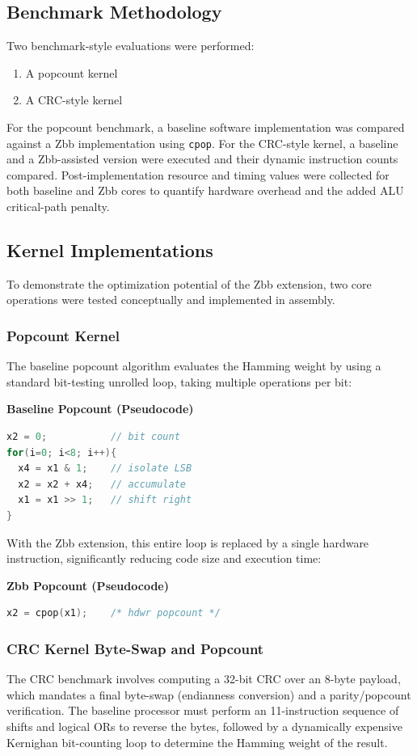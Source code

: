 \documentclass[conference]{IEEEtran}
\begin{document}
	\subsection{Benchmark Methodology}
	Two benchmark-style evaluations were performed:
	\begin{enumerate}
		\item A popcount kernel
		\item A CRC-style kernel
	\end{enumerate}
	
	For the popcount benchmark, a baseline software implementation was compared against a Zbb implementation using \texttt{cpop}. For the CRC-style kernel, a baseline and a Zbb-assisted version were executed and their dynamic instruction counts compared. Post-implementation resource and timing values were collected for both baseline and Zbb cores to quantify hardware overhead and the added ALU critical-path penalty.
	
	\subsection{Kernel Implementations}
	To demonstrate the optimization potential of the Zbb extension, two core operations were tested conceptually and implemented in assembly.
	
	\subsubsection{Popcount Kernel}
	The baseline popcount algorithm evaluates the Hamming weight by using a standard bit-testing unrolled loop, taking multiple operations per bit:

\noindent\textbf{Baseline Popcount (Pseudocode)}
\begin{lstlisting}[language=C]
x2 = 0;           // bit count
for(i=0; i<8; i++){
  x4 = x1 & 1;    // isolate LSB
  x2 = x2 + x4;   // accumulate
  x1 = x1 >> 1;   // shift right
}
\end{lstlisting}

	With the Zbb extension, this entire loop is replaced by a single hardware instruction, significantly reducing code size and execution time:

\noindent\textbf{Zbb Popcount (Pseudocode)}
\begin{lstlisting}[language=C]
x2 = cpop(x1);    /* hdwr popcount */
\end{lstlisting}

	\subsubsection{CRC Kernel Byte-Swap and Popcount}
	The CRC benchmark involves computing a 32-bit CRC over an 8-byte payload, which mandates a final byte-swap (endianness conversion) and a parity/popcount verification. The baseline processor must perform an 11-instruction sequence of shifts and logical ORs to reverse the bytes, followed by a dynamically expensive Kernighan bit-counting loop to determine the Hamming weight of the result.
	
\end{document}
